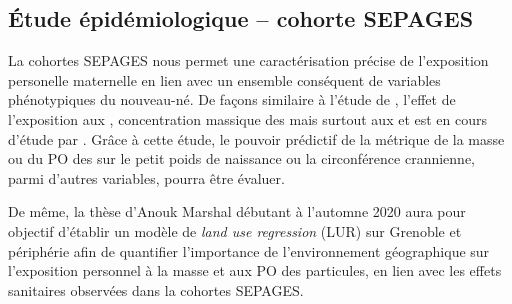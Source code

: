 \subsection{Étude épidémiologique -- cohorte SEPAGES}

La cohortes SEPAGES nous permet une caractérisation précise de l'exposition personelle
maternelle en lien avec un ensemble conséquent de variables phénotypiques du nouveau-né.
De façons similaire à l'étude de \cite{ouidirEstimation2015}, l'effet de l'exposition aux
, concentration massique des \PMdc mais surtout aux \POAAv{} et \PODTTv{} est en
cours d'étude par \cite{borlazaHealthinprep.}.
Grâce à cette étude, le pouvoir prédictif de la métrique de la masse ou du PO des \PMdc{}
sur le petit poids de naissance ou la circonférence crannienne, parmi d'autres variables,
pourra être évaluer.

De même, la thèse d'Anouk Marshal débutant à l'automne 2020 aura pour objectif d'établir
un modèle de \textit{land use regression} (LUR) sur Grenoble et périphérie afin de
quantifier l'importance de l'environnement géographique sur l'exposition personnel à la
masse et aux PO des particules, en lien avec les effets sanitaires observées dans la
cohortes SEPAGES.


